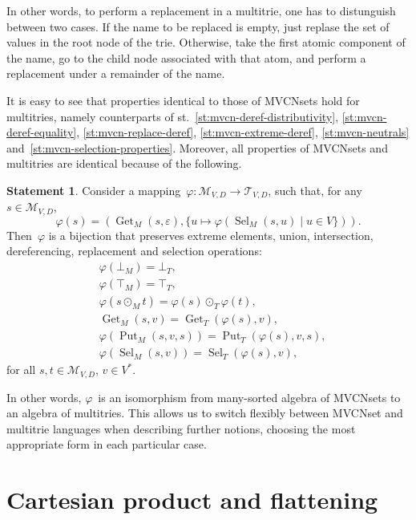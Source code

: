 \documentclass{article}
\theoremstyle{definition}
\newtheorem{St}{Statement}
\newcommand{\setcharmvcn}{M}
\newcommand{\setcharmt}{T}
\newcommand{\setsymbol}[3]{\mathcal{#1}_{#2,#3}}
\newcommand{\setmvcn}[2]{\setsymbol{\setcharmvcn}{#1}{#2}}
\newcommand{\setmt}[2]{\setsymbol{\setcharmt}{#1}{#2}}
\newcommand{\select}{\operatorname{Sel}}
\newcommand{\deref}{\operatorname{Get}}
\newcommand{\putval}{\operatorname{Put}}
\begin{document}
In other words, to perform a replacement in a multitrie, one has to distunguish
between two cases. If the name to be replaced is empty, just replase the set of
values in the root node of the trie. Otherwise, take the first atomic component
of the name, go to the child node associated with that atom, and perform a
replacement under a remainder of the name.

It is easy to see that properties identical to those of MVCNsets
hold for multitries, namely counterparts of
st.~\ref{st:mvcn-deref-distributivity},
\ref{st:mvcn-deref-equality},
\ref{st:mvcn-replace-deref},
\ref{st:mvcn-extreme-deref},
\ref{st:mvcn-neutrals}
and~\ref{st:mvcn-selection-properties}.
Moreover, all properties of MVCNsets and multitries are identical because
of the following.

\begin{St}\label{st:isomorph}
Consider a mapping~$\varphi: \setmvcn{V}{D} \to \setmt{V}{D}$, such that,
for any~$s\in \setmvcn{V}{D}$,
\[
  \varphi(s) = (
    \deref_\setcharmvcn(s, \varepsilon) ,
    \{ u \mapsto \varphi(\select_\setcharmvcn(s, u) \mid u\in V \})
  ) .
\]
Then~$\varphi$ is a bijection that preserves
extreme elements, union, intersection, dereferencing, replacement and selection
operations:
\begin{eqnarray*}
  & \varphi(\bot_{\setcharmvcn}) = \bot_{\setcharmt}, \\
  & \varphi(\top_{\setcharmvcn}) = \top_{\setcharmt}, \\
  & \varphi(s \mathbin{\odot_{\setcharmvcn}} t) =
      \varphi(s) \mathbin{\odot_{\setcharmt}} \varphi(t) , \\
  & \deref_{\setcharmvcn}(s, v) =
      \deref_{\setcharmt}(\varphi(s), v) , \\
  & \varphi(\putval_{\setcharmvcn}(s, v, s)) =
      \putval_{\setcharmt}(\varphi(s), v, s) , \\
  & \varphi(\select_{\setcharmvcn}(s, v)) =
      \select_{\setcharmt}(\varphi(s), v) ,
\end{eqnarray*}
for all $s,t \in \setmvcn{V}{D}$, $v \in V^\ast$.
\end{St}

In other words, $\varphi$~is an isomorphism from many-sorted algebra of
MVCNsets to an algebra of multitries.
This allows us to switch flexibly between MVCNset and multitrie
languages when describing further notions, choosing the most
appropriate form in each particular case.



\section{Cartesian product and flattening}
\end{document}
